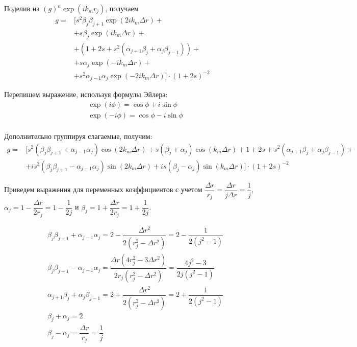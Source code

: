 Поделив на $(g)^n \exp(i k_m r_j)$, получаем
\begin{equation}
\begin{split}
	g = &\biggl[ s^2 \beta_j \beta_{j+1} \exp(2i k_m \Delta r) + \\
	& + s \beta_j \exp(i k_m \Delta r) + \\ 
	& + \left( 1 + 2s + s^2 \left( \alpha_{j+1}\beta_j + \alpha_j \beta_{j-1} \right) \right) + \\
	& + s \alpha_j \exp(- i k_m \Delta r) + \\
	& +  s^2 \alpha_{j-1} \alpha_j  \exp(-2i k_m \Delta r) \biggr] \cdot (1+2s)^{-2} 
\end{split}	
\end{equation}

Перепишем выражение, используя формулы Эйлера:
\begin{equation} \label{eq:alen-chen_euler}
\begin{split}
	&\exp(i \phi) = \cos{\phi} + i \sin{\phi} \\
	&\exp(- i \phi) = \cos{\phi} - i \sin{\phi} \\
\end{split}
\end{equation}

Дополнительно группируя слагаемые, получим:
\begin{equation}
	\begin{split}
		g = &\biggl[ s^2 (\beta_j \beta_{j+1} + \alpha_{j-1} \alpha_j ) \cos{(2 k_m \Delta r)} + s (\beta_j + \alpha_j) \cos{(k_m \Delta r)} + 1 + 2s + s^2(\alpha_{j+1} \beta_j + \alpha_j \beta_{j-1}) + \\
		& + i s^2 (\beta_j \beta_{j+1} - \alpha_{j-1} \alpha_j) \sin{(2 k_m \Delta r)} + i s (\beta_j - \alpha_j) \sin{(k_m \Delta r)}
		\biggr] \cdot (1+2s)^{-2} 
	\end{split}	
\end{equation}

Приведем выражения для переменных коэффициентов с учетом $\dfrac{\Delta r}{r_j} = \dfrac{\Delta r}{j \Delta r} = \dfrac{1}{j}$, $\alpha_j = 1 - \dfrac{\Delta r}{2 r_j} = 1 - \dfrac{1}{2j}$ и $\beta_j = 1 + \dfrac{\Delta r}{2 r_j} = 1 + \dfrac{1}{2j}$. 

\begin{align}
	&\beta_j \beta_{j+1} + \alpha_{j-1} \alpha_j = 2 - \dfrac{\Delta r^2}{2 (r_j^2 - \Delta r^2)} = 2 - \dfrac{1}{2(j^2 - 1)} \\
	&\beta_j \beta_{j+1} - \alpha_{j-1} \alpha_j = \dfrac{\Delta r (4 r_j^2 - 3 \Delta r^2)}{2 r_j (r_j^2 - \Delta r^2)} = \dfrac{4j^2 - 3}{2j(j^2 - 1)} \\
	&\alpha_{j+1} \beta_j + \alpha_j \beta_{j-1} = 2 + \dfrac{\Delta r^2}{2(r_j^2 - \Delta r^2)} = 2 + \dfrac{1}{2(j^2 - 1)} \\
	&\beta_j + \alpha_j = 2 \\
	&\beta_j - \alpha_j = \dfrac{\Delta r}{r_j} = \dfrac{1}{j}
\end{align}

